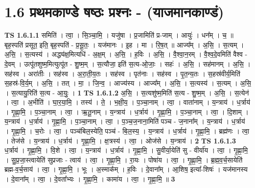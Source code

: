 \documentclass[17pt]{extarticle}
\begin{document}
\section*{ 1.6     प्रथमकाण्डे षष्ठः प्रश्नः - (याजमानकाण्डं) }
                                \textbf{ TS 1.6.1.1} \newline
                  समिति॑ । त्वा॒ । सि॒ञ्चा॒मि॒ । यजु॑षा । प्र॒जामिति॑ प्र-जाम् । आयुः॑ । धन᳚म् । च॒ ॥ बृह॒स्पति॑ प्रसूत॒ इति॒ बृह॒स्पति॑ - प्र॒सू॒तः॒ । यज॑मानः । इ॒ह । मा । रि॒ष॒त् ॥ आज्य᳚म् । अ॒सि॒ । स॒त्यम् । अ॒सि॒ । स॒त्यस्य॑ । अद्ध्य॑क्ष॒मित्यधि॑ - अ॒क्ष॒म् । अ॒सि॒ । ह॒विः । अ॒सि॒ । वै॒श्वा॒न॒रम् । वै॒श्व॒दे॒वमिति॑ वैश्व - दे॒वम् । उत्पू॑तशुष्म॒मित्युत्पू॑त - शु॒ष्म॒म् । स॒त्यौजा॒ इति॑ स॒त्य-ओ॒जाः॒ । सहः॑ । अ॒सि॒ । सह॑मानम् । अ॒सि॒ । सह॑स्व । अरा॑तीः । सह॑स्व । अ॒रा॒ती॒य॒तः । सह॑स्व । पृत॑नाः । सह॑स्व । पृ॒त॒न्य॒तः । स॒हस्र॑वीर्य॒मिति॑ स॒हस्र॑-वि॒र्य॒म् । अ॒सि॒ । तत् । मा॒ । जि॒न्व॒ । आज्य॑स्य । आज्य᳚म् । अ॒सि॒ । स॒त्यस्य॑ । स॒त्यम् । अ॒सि॒ । स॒त्यायु॒रिति॑ स॒त्य - आ॒युः॒ । \textbf{  1} \newline
                  \newline
                                \textbf{ TS 1.6.1.2} \newline
                  अ॒सि॒ । स॒त्यशु॑ष्म॒मिति॑ स॒त्य - शु॒ष्म॒म् । अ॒सि॒ । स॒त्येन॑ । त्वा॒ । अ॒भीति॑ । घा॒र॒या॒मि॒ । तस्य॑ । ते॒ । भ॒क्षी॒य॒ । प॒ञ्चा॒नाम् । त्वा॒ । वाता॑नाम् । य॒न्त्राय॑ । ध॒र्त्राय॑ । गृ॒ह्णा॒मि॒ । प॒ञ्चा॒नाम् । त्वा॒ । ऋ॒तू॒नाम् । य॒न्त्राय॑ । ध॒र्त्राय॑ । गृ॒ह्णा॒मि॒ । प॒ञ्चा॒नाम् । त्वा॒ । दि॒शाम् । य॒न्त्राय॑ । ध॒र्त्राय॑ । गृ॒ह्णा॒मि॒ । प॒ञ्चा॒नाम् । त्वा॒ । प॒ञ्च॒ज॒नाना॒मिति॑ पञ्च - ज॒नाना᳚म् । य॒न्त्राय॑ । ध॒र्त्राय॑ । गृ॒ह्णा॒मि॒ । च॒रोः । त्वा॒ । पञ्च॑बिल॒स्येति॒ पञ्च॑ - बि॒ल॒स्य॒ । य॒न्त्राय॑ । ध॒र्त्राय॑ । गृ॒ह्णा॒मि॒ । ब्रह्म॑णः । त्वा॒ । तेज॑से । य॒न्त्राय॑ । ध॒र्त्राय॑ । गृ॒ह्णा॒मि॒ । क्ष॒त्रस्य॑ । त्वा॒ । ओज॑से । य॒न्त्राय॑ । \textbf{  2} \newline
                  \newline
                                \textbf{ TS 1.6.1.3} \newline
                  ध॒र्त्राय॑ । गृ॒ह्णा॒मि॒ । वि॒शे । त्वा॒ । य॒न्त्राय॑ । ध॒र्त्राय॑ । गृ॒ह्णा॒मि॒ । सु॒वीर्या॒येति॑ सु - वीर्या॑य । त्वा॒ । गृ॒ह्णा॒मि॒ । सु॒प्र॒जा॒स्त्वायेति॑ सुप्रजाः - त्वाय॑ । त्वा॒ । गृ॒ह्णा॒मि॒ । रा॒यः । पोषा॑य । त्वा॒ । गृ॒ह्णा॒मि॒ । ब्र॒ह्म॒व॒र्च॒सायेति॑ ब्रह्म-व॒र्च॒साय॑ । त्वा॒ । गृ॒ह्णा॒मि॒ । भूः । अ॒स्माक᳚म् । ह॒विः । दे॒वाना᳚म् । आ॒शिष॒ इत्या᳚-शिषः॑ । यज॑मानस्य । दे॒वाना᳚म् । त्वा॒ । दे॒वता᳚भ्यः । गृ॒ह्णा॒मि॒ । कामा॑य । त्वा॒ । गृ॒ह्णा॒मि॒ ॥ \textbf{  3} \newline
\end{document}
